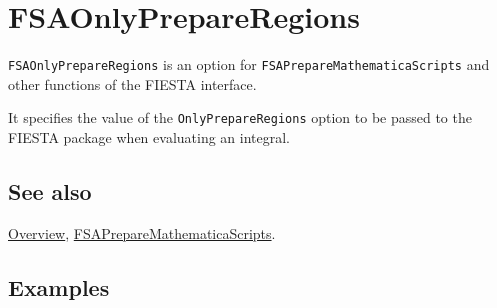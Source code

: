 \documentclass[../FeynHelpersManual.tex]{subfiles}
\begin{document}
\begin{Shaded}
\begin{Highlighting}[]
 
\end{Highlighting}
\end{Shaded}

\hypertarget{fsaonlyprepareregions}{
\section{FSAOnlyPrepareRegions}\label{fsaonlyprepareregions}}

\texttt{FSAOnlyPrepareRegions} is an option for
\texttt{FSAPrepareMathematicaScripts} and other functions of the FIESTA
interface.

It specifies the value of the \texttt{OnlyPrepareRegions} option to be
passed to the FIESTA package when evaluating an integral.

\subsection{See also}

\hyperlink{toc}{Overview},
\hyperlink{fsapreparemathematicascripts}{FSAPrepareMathematicaScripts}.

\subsection{Examples}
\end{document}
